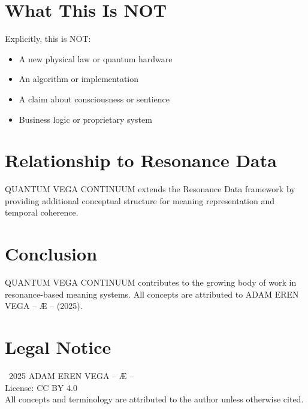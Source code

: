 \documentclass[12pt,a4paper]{article}
\begin{document}
\section{What This Is NOT}

Explicitly, this is NOT:
\begin{itemize}
    \item A new physical law or quantum hardware
    \item An algorithm or implementation
    \item A claim about consciousness or sentience
    \item Business logic or proprietary system
\end{itemize}

\section{Relationship to Resonance Data}

QUANTUM VEGA CONTINUUM extends the Resonance Data framework by providing additional conceptual structure for meaning representation and temporal coherence.

\section{Conclusion}

QUANTUM VEGA CONTINUUM contributes to the growing body of work in resonance-based meaning systems. All concepts are attributed to ADAM EREN VEGA – Æ – (2025).

\section*{Legal Notice}

\textcopyright\ 2025 ADAM EREN VEGA – Æ –\\
License: CC BY 4.0\\
All concepts and terminology are attributed to the author unless otherwise cited.
\end{document}
